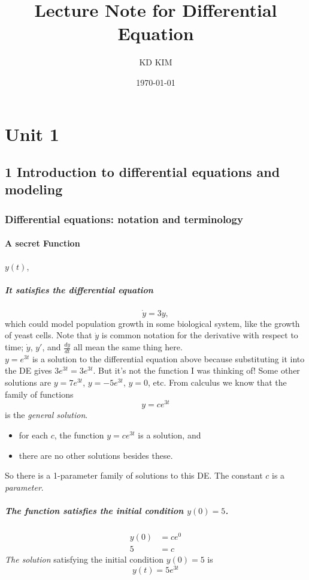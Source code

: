 \documentclass[8pt, a4paper]{article}
\title{Lecture Note for Differential Equation}
\author{KD KIM}
\date{\today}
\begin{document}
\maketitle
\clearpage

\section{Unit 1}

\subsection{1 Introduction to differential equations and modeling}

\subsubsection{Differential equations: notation and terminology}

\paragraph{A secret Function} $y(t)$, \\
\subparagraph{It satisfies the differential equation}
\begin{equation*}
  \dot{y} = 3y,
\end{equation*}
which could model population growth in some biological system, like the growth of yeast cells.
Note that \emph{\color{blue} $\dot{y}$} is common notation for the derivative with respect to time;
$\dot{y}$, $y'$, and $\frac{dy}{dt}$ all mean the same thing here.\\
$y = e^{3t}$ is a solution to the differential equation above because substituting it into the DE gives
$3e^{3t}=3e^{3t}$. But it's not the function I was thinking of! Some other solutions are
$y = 7e^{3t}$, $y = -5e^{3t}$, $y = 0$, etc. From calculus we know that the family of functions
\begin{equation*}
  y = ce^{3t}
\end{equation*}
is the \emph{\color{blue} general solution}.
\begin{itemize}
\item for each $c$, the function $y=ce^{3t}$ is a solution, and
\item there are no other solutions besides these.
\end{itemize}
So there is a 1-parameter family of solutions to this DE.
The constant $c$ is a \emph{\color{blue} parameter}.
\subparagraph{The function satisfies the initial condition $y(0)=5$.}
\begin{align*}
  y(0) &= ce^{0} \\
  5 &= c  
\end{align*}
\emph{The solution} satisfying the initial condition $y(0) = 5$ is
\begin{equation*}
  y(t) = 5e^{3t}
\end{equation*}
\end{document}

